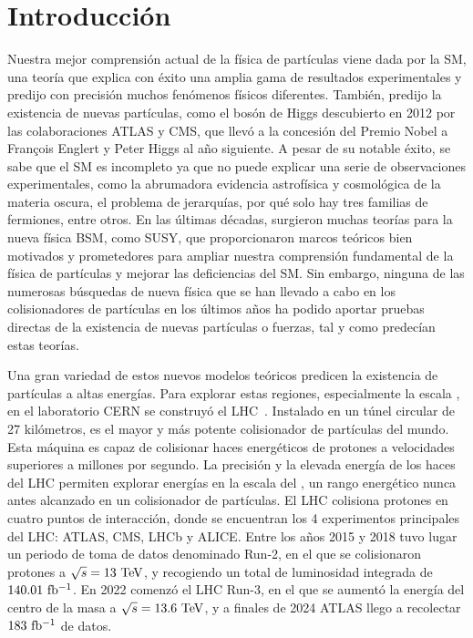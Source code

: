 \chapter*{Introducción}

Nuestra mejor comprensión actual de la física de partículas viene dada por la \ac{SM}, una teoría que explica con éxito una amplia gama de resultados experimentales y predijo con precisión muchos fenómenos físicos diferentes. También, predijo la existencia de nuevas partículas, como el bosón de Higgs descubierto en 2012 por las colaboraciones \acs{ATLAS} y \acs{CMS}, que llevó a la concesión del Premio Nobel a François Englert y Peter Higgs al año siguiente. A pesar de su notable éxito, se sabe que el \ac{SM} es incompleto ya que no puede explicar una serie de observaciones experimentales, como la abrumadora evidencia astrofísica y cosmológica de la materia oscura, el problema de jerarquías, por qué solo hay tres familias de fermiones, entre otros. En las últimas décadas, surgieron muchas teorías para la nueva física \ac{BSM}, como \ac{SUSY}, que proporcionaron marcos teóricos bien motivados y prometedores para ampliar nuestra comprensión fundamental de la física de partículas y mejorar las deficiencias del \ac{SM}. Sin embargo, ninguna de las numerosas búsquedas de nueva física que se han llevado a cabo en los colisionadores de partículas en los últimos años ha podido aportar pruebas directas de la existencia de nuevas partículas o fuerzas, tal y como predecían estas teorías.

Una gran variedad de estos nuevos modelos teóricos predicen la existencia de partículas a altas energías. Para explorar estas regiones, especialmente la escala \tev, en el laboratorio \ac{CERN} se construyó el \ac{LHC}~\cite{LHC-Machine}. Instalado en un túnel circular de 27 kilómetros, es el mayor y más potente colisionador de partículas del mundo. Esta máquina es capaz de colisionar haces energéticos de protones a velocidades superiores a millones por segundo. La precisión y la elevada energía de los haces del \ac{LHC} permiten explorar energías en la escala del \tev, un rango energético nunca antes alcanzado en un colisionador de partículas. El \ac{LHC} colisiona protones en cuatro puntos de interacción, donde se encuentran los 4 experimentos principales del \ac{LHC}: \ac{ATLAS}, \ac{CMS}, \ac{LHCb} y \ac{ALICE}.
Entre los años 2015 y 2018 tuvo lugar un periodo de toma de datos denominado Run-2, en el que se colisionaron protones a \(\sqs=13~\tev\), y recogiendo un total de luminosidad integrada de \(140.01~\ifb\). En 2022 comenzó el \ac{LHC} Run-3, en el que se aumentó la energía del centro de la masa a \(\sqs=13.6~\tev\), y a finales de 2024 \ac{ATLAS} llego a recolectar \(183~\ifb\) de datos.

